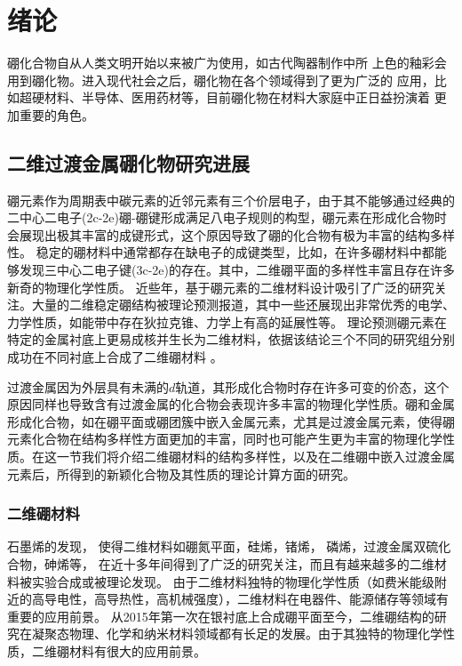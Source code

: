 \chapter{绪论}\label{chapter_introduction}
硼化合物自从人类文明开始以来被广为使用，如古代陶器制作中所
上色的釉彩会用到硼化物。进入现代社会之后，硼化物在各个领域得到了更为广泛的
应用，比如超硬材料、半导体、医用药材等，目前硼化物在材料大家庭中正日益扮演着
更加重要的角色\cite{albert2009boron}。

\section{二维过渡金属硼化物研究进展}

硼元素作为周期表中碳元素的近邻元素有三个价层电子，由于其不能够通过经典的二中心二电子(2c-2e)硼-硼键形成满足八电子规则的构型，硼元素在形成化合物时会展现出极其丰富的成键形式，这个原因导致了硼的化合物有极为丰富的结构多样性。
稳定的硼材料中通常都存在缺电子的成键类型，比如，在许多硼材料中都能够发现三中心二电子键(3c-2e)的存在。其中，二维硼平面的多样性丰富且存在许多新奇的物理化学性质。
近些年，基于硼元素的二维材料设计吸引了广泛的研究关注。大量的二维稳定硼结构被理论预测报道，其中一些还展现出非常优秀的电学、力学性质，如能带中存在狄拉克锥、力学上有高的延展性等。
理论预测硼元素在特定的金属衬底上更易成核并生长为二维材料\cite{liu2013probing,liu2013boron,zhang2015two}，依据该结论三个不同的研究组分别成功在不同衬底上合成了二维硼材料\cite{mannix2015synthesis,zhong2017metastable,zhong2017synthesis,li2018experimental,feng2016experimental} 。

过渡金属因为外层具有未满的$d$轨道，其形成化合物时存在许多可变的价态，这个原因同样也导致含有过渡金属的化合物会表现许多丰富的物理化学性质。硼和金属形成化合物，如在硼平面或硼团簇中嵌入金属元素，尤其是过渡金属元素，使得硼元素化合物在结构多样性方面更加的丰富，同时也可能产生更为丰富的物理化学性质。在这一节我们将介绍二维硼材料的结构多样性，以及在二维硼中嵌入过渡金属元素后，所得到的新颖化合物及其性质的理论计算方面的研究。

\subsection{二维硼材料}
石墨烯\cite{novoselov2005two, zhang2005experimental, ferrari2006raman,yan2012first, lu2009tuning}的发现，
使得二维材料如硼氮平面\cite{watanabe2004direct}，硅烯\cite{liu2014comparison, molle2018silicene, li2018stable}，锗烯\cite{liu2015multiple}，
磷烯\cite{hu2018strong}，过渡金属双硫化合物\cite{cai2014constructing, wang2012electronics, pei2015exciton}，砷烯\cite{zhang2015atomically}等，
在近十多年间得到了广泛的研究关注，而且有越来越多的二维材料被实验合成或被理论发现。
由于二维材料独特的物理化学性质（如费米能级附近的高导电性，高导热性，高机械强度），二维材料在电器件、能源储存等领域有重要的应用前景。
从2015年第一次在银衬底上合成硼平面至今，二维硼结构的研究在凝聚态物理、化学和纳米材料领域都有长足的发展。由于其独特的物理化学性质，二维硼材料有很大的应用前景。

